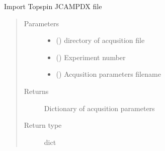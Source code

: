 \documentclass[letterpaper,10pt,english]{sphinxmanual}
\begin{document}
\begin{fulllineitems}
\label{\detokenize{dnpImport:dnpLab.dnpImport.topspin.load_acqu}}
Import Topspin JCAMPDX file
\begin{quote}\begin{description}
\item[{Parameters}] \leavevmode\begin{itemize}
\item {} 
 () \sphinxhyphen{}\sphinxhyphen{} directory of acqusition file

\item {} 
 () \sphinxhyphen{}\sphinxhyphen{} Experiment number

\item {} 
 () \sphinxhyphen{}\sphinxhyphen{} Acqusition parameters filename

\end{itemize}

\item[{Returns}] \leavevmode
Dictionary of acqusition parameters

\item[{Return type}] \leavevmode
dict

\end{description}\end{quote}

\end{fulllineitems}


\begin{fulllineitems}
\label{\detokenize{dnpImport:dnpLab.dnpImport.topspin.load_proc}}
\end{fulllineitems}
\end{document}
